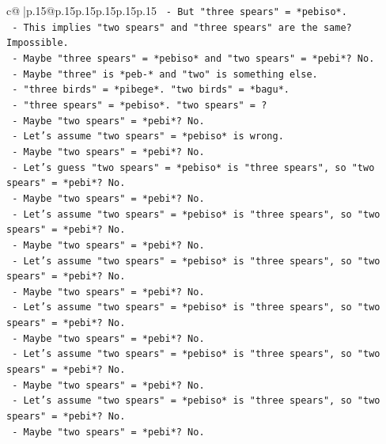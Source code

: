 \documentclass{article}
\begin{document}
{\begin{supertabular}{c@{$\;$}|p{.15\linewidth}@{}p{.15\linewidth}p{.15\linewidth}p{.15\linewidth}p{.15\linewidth}p{.15\linewidth}}
{{{\texttt{            {-}   But "three spears" = *pebiso*.} \\
\texttt{            {-}   This implies "two spears" and "three spears" are the same? Impossible.} \\
\texttt{            {-}   Maybe "three spears" = *pebiso* and "two spears" = *pebi*? No.} \\
\texttt{            {-}   Maybe "three" is *peb{-}* and "two" is something else.} \\
\texttt{            {-}   "three birds" = *pibege*. "two birds" = *bagu*.} \\
\texttt{            {-}   "three spears" = *pebiso*. "two spears" = ?} \\
\texttt{            {-}   Maybe "two spears" = *pebi*? No.} \\
\texttt{            {-}   Let's assume "two spears" = *pebiso* is wrong.} \\
\texttt{            {-}   Maybe "two spears" = *pebi*? No.} \\
\texttt{            {-}   Let's guess "two spears" = *pebiso* is "three spears", so "two spears" = *pebi*? No.} \\
\texttt{            {-}   Maybe "two spears" = *pebi*? No.} \\
\texttt{            {-}   Let's assume "two spears" = *pebiso* is "three spears", so "two spears" = *pebi*? No.} \\
\texttt{            {-}   Maybe "two spears" = *pebi*? No.} \\
\texttt{            {-}   Let's assume "two spears" = *pebiso* is "three spears", so "two spears" = *pebi*? No.} \\
\texttt{            {-}   Maybe "two spears" = *pebi*? No.} \\
\texttt{            {-}   Let's assume "two spears" = *pebiso* is "three spears", so "two spears" = *pebi*? No.} \\
\texttt{            {-}   Maybe "two spears" = *pebi*? No.} \\
\texttt{            {-}   Let's assume "two spears" = *pebiso* is "three spears", so "two spears" = *pebi*? No.} \\
\texttt{            {-}   Maybe "two spears" = *pebi*? No.} \\
\texttt{            {-}   Let's assume "two spears" = *pebiso* is "three spears", so "two spears" = *pebi*? No.} \\
\texttt{            {-}   Maybe "two spears" = *pebi*? No.} \\
}}}
\end{supertabular}}
\end{document}
